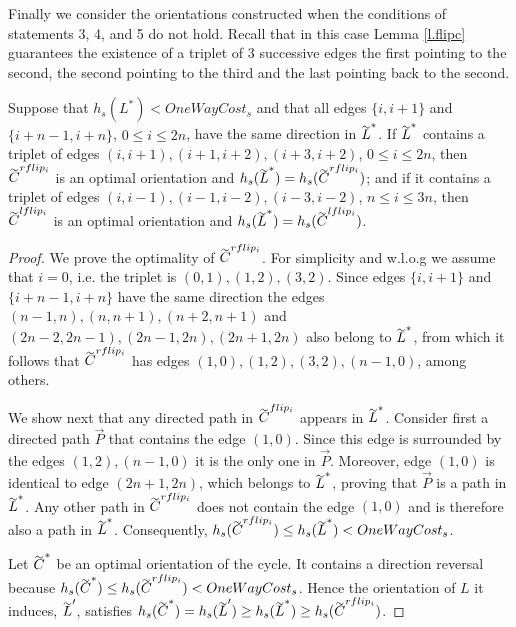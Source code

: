 Finally we consider the orientations constructed when the conditions of statements 3, 4, and 5 
do not hold. Recall that in this case Lemma \ref{l.flipc} guarantees the existence of a triplet
of 3 successive edges the first pointing to the second, the second pointing to the third and the last pointing back to the second.
\begin{lemma}\label{l.last}
	Suppose that $h_s({L}^*) < OneWayCost_s$ and that 
	all edges $\{i,i+1\}$ and $\{i+n-1,i+n\}$, $0\leq i \leq 2n$, have the same direction in $\tildeb{L}^*$.
	If $\tildeb{L}^*$  contains a triplet of edges  $(i,i+1),(i+1,i+2),(i+3,i+2)$, $0\leq i\leq 2n$, then 
	$\tildeb{C}^{rflip_i}$ is an optimal orientation and $h_s(\tildeb{L}^*) = h_s(\tildeb{C}^{rflip_i})$;
	and if it contains a triplet of edges
	$(i,i-1),(i-1,i-2),(i-3,i-2)$, $n\leq i\leq 3n$,  then $\tildeb{C}^{lflip_i}$ 
	is an optimal orientation and $h_s(\tildeb{L}^*) = h_s(\tildeb{C}^{lflip_i})$.
	\end{lemma}
\begin{proof}
We prove the optimality of 	$\tildeb{C}^{rflip_i}$.
For simplicity and w.l.o.g we assume that $i=0$, i.e. the triplet is $(0,1), (1,2),(3,2)$. 
Since edges $\{i,i+1\}$ and $\{i+n-1,i+n\}$ have the same direction
the edges $(n-1,n),(n,n+1),(n+2,n+1)$ and $(2n-2,2n-1),(2n-1,2n), (2n+1,2n) $ 
also belong to $\tildeb{L}^*$,
from which it follows that $\tildeb{C}^{rflip_i}$ has edges 
	 $(1,0), (1,2),(3,2),(n-1,0)$, among others.
	
	We show next that any directed path in $\tildeb{C}^{flip_i}$ appears in $\tildeb{L}^*$. Consider first a directed path $\vec{P}$ that contains the edge $(1,0)$. 
	Since this edge is surrounded by the edges $(1,2), (n-1,0)$ it is the only one in $\vec{P}$. Moreover, edge $(1,0)$ is identical to edge $(2n+1,2n)$, which belongs to 
	$\tildeb{L}^*$, proving that  $\vec{P}$ is a path in $\tildeb{L}^*$.
	Any other path in $\tildeb{C}^{rflip_i}$ does not contain the edge $(1,0)$ and is therefore 
	also a path in $\tildeb{L}^*$. 
	Consequently, $h_s(\tildeb{C}^{rflip_i})\leq h_s(\tildeb{L}^*)<OneWayCost_s$.
	
	Let $\tildeb{C}^*$ be an optimal orientation of the cycle. It contains a direction reversal
	because $h_s(\tildeb{C}^*)\leq h_s(\tildeb{C}^{rflip_i})<OneWayCost_s$.
	Hence the orientation of $L$ it induces, $\tildeb{L}'$, satisfies
	$h_s(\tildeb{C}^*)=h_s(\tildeb{L}')\geq h_s(\tildeb{L}^*)\geq h_s(\tildeb{C}^{rflip_i})$.
\end{proof}

